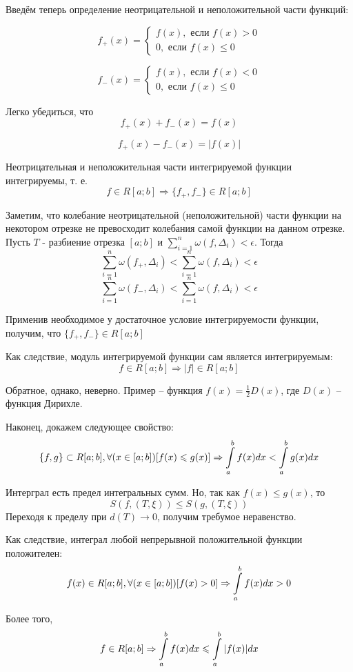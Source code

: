Введём теперь определение неотрицательной и неположительной части функций:

\begin{opr}
$$
f_+(x)=\left\{
\begin{array}{l}
f(x), \mbox{~если~} f(x) > 0 \\
0,    \mbox{~если~} f(x) \leq 0
\end{array}
\right.
$$
\end{opr}


\begin{opr}
$$
f_-(x)=\left\{
\begin{array}{l}
f(x), \mbox{~если~} f(x) < 0 \\
0,    \mbox{~если~} f(x) \leq 0
\end{array}
\right.
$$
\end{opr}

Легко убедиться, что
$$
f_+(x)+f_-(x)=f(x)
$$

$$
f_+(x)-f_-(x)=|f(x)|
$$

Неотрицательная и неположительная части интегрируемой функции интегрируемы, т. е.
$$
f\in R[a;b] \Rightarrow \{f_+,f_-\}\in R[a;b]
$$

\dokvo

Заметим, что колебание неотрицательной (неположительной) части функции на некотором отрезке не превосходит колебания самой функции на данном отрезке.
Пусть $T$ - разбиение отрезка $[a;b]$ и ${\sum\limits_{i=1}^n \omega(f,\Delta_i)<\epsilon}$.
Тогда
$$\sum\limits_{i=1}^n \omega(f_+,\Delta_i)<\sum\limits_{i=1}^n \omega(f,\Delta_i)<\epsilon$$
$$\sum\limits_{i=1}^n \omega(f_-,\Delta_i)<\sum\limits_{i=1}^n \omega(f,\Delta_i)<\epsilon$$

Применив необходимое у достаточное условие интегрируемости функции, получим, что $\{f_+,f_-\}\in R[a;b]$

Как следствие, модуль интегрируемой функции сам является интегрируемым:
$$
f \in R[a;b] \Rightarrow |f| \in R[a;b] 
$$

Обратное, однако, неверно.
Пример -- функция $f(x)=\frac{1}{2}D(x)$, где $D(x)$ -- функция Дирихле.

Наконец, докажем следующее свойство:
$$
\{f,g\}\subset R[a;b], \forall(x\in[a;b])[f(x)\leqslant g(x)] \Rightarrow \int\limits_a^b f(x)dx < \int\limits_a^b g(x) dx
$$

\dokvo

Интерграл есть предел интегральных сумм.
Но, так как $f(x)\leq g(x)$, то
$$
S(f,(T,\xi))\leq S(g,(T,\xi))
$$
Переходя к пределу при $d(T)\to 0$, получим требумое неравенство.

\dokno

Как следствие, интеграл любой непрерывной положительной функции положителен:
$$
f(x)\in R[a;b], \forall(x\in[a;b])[f(x)>0] \Rightarrow \int\limits_a^b f(x) dx > 0
$$

Более того,
$$
f\in R[a;b] \Rightarrow \int\limits_a^b f(x) dx \leqslant \int\limits_a^b |f(x)| dx 
$$
